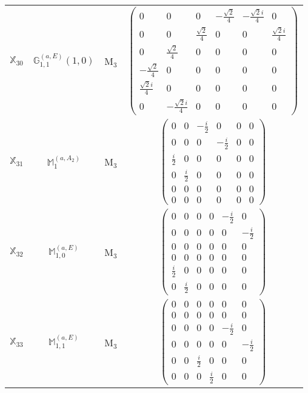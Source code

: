 \documentclass[fleqn,10pt,landscape]{article}
\begin{document}
\begin{itemize}
\begin{center}
\begin{longtable}{c|c|c|c}
$ \mathbb{X}_{30} $ & $\mathbb{G}_{1,1}^{(a,E)}(1,0)$ & M$_{3}$ & $\begin{pmatrix} 0 & 0 & 0 & - \frac{\sqrt{2}}{4} & - \frac{\sqrt{2} i}{4} & 0 \\ 0 & 0 & \frac{\sqrt{2}}{4} & 0 & 0 & \frac{\sqrt{2} i}{4} \\ 0 & \frac{\sqrt{2}}{4} & 0 & 0 & 0 & 0 \\ - \frac{\sqrt{2}}{4} & 0 & 0 & 0 & 0 & 0 \\ \frac{\sqrt{2} i}{4} & 0 & 0 & 0 & 0 & 0 \\ 0 & - \frac{\sqrt{2} i}{4} & 0 & 0 & 0 & 0 \end{pmatrix}$ \\
$ \mathbb{X}_{31} $ & $\mathbb{M}_{1}^{(a,A_{2})}$ & M$_{3}$ & $\begin{pmatrix} 0 & 0 & - \frac{i}{2} & 0 & 0 & 0 \\ 0 & 0 & 0 & - \frac{i}{2} & 0 & 0 \\ \frac{i}{2} & 0 & 0 & 0 & 0 & 0 \\ 0 & \frac{i}{2} & 0 & 0 & 0 & 0 \\ 0 & 0 & 0 & 0 & 0 & 0 \\ 0 & 0 & 0 & 0 & 0 & 0 \end{pmatrix}$ \\
$ \mathbb{X}_{32} $ & $\mathbb{M}_{1,0}^{(a,E)}$ & M$_{3}$ & $\begin{pmatrix} 0 & 0 & 0 & 0 & - \frac{i}{2} & 0 \\ 0 & 0 & 0 & 0 & 0 & - \frac{i}{2} \\ 0 & 0 & 0 & 0 & 0 & 0 \\ 0 & 0 & 0 & 0 & 0 & 0 \\ \frac{i}{2} & 0 & 0 & 0 & 0 & 0 \\ 0 & \frac{i}{2} & 0 & 0 & 0 & 0 \end{pmatrix}$ \\
$ \mathbb{X}_{33} $ & $\mathbb{M}_{1,1}^{(a,E)}$ & M$_{3}$ & $\begin{pmatrix} 0 & 0 & 0 & 0 & 0 & 0 \\ 0 & 0 & 0 & 0 & 0 & 0 \\ 0 & 0 & 0 & 0 & - \frac{i}{2} & 0 \\ 0 & 0 & 0 & 0 & 0 & - \frac{i}{2} \\ 0 & 0 & \frac{i}{2} & 0 & 0 & 0 \\ 0 & 0 & 0 & \frac{i}{2} & 0 & 0 \end{pmatrix}$ \\

\end{longtable}
\end{center}
\end{itemize}
\end{document}
